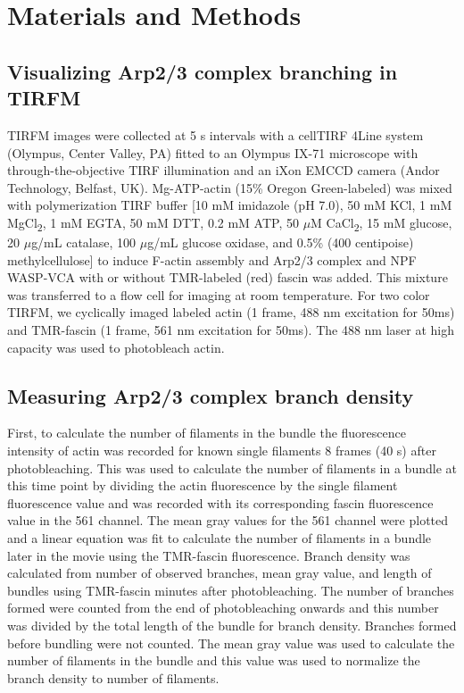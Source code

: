 \section{Materials and Methods}\label{bundlers-matmeth}
\subsection{Visualizing Arp2/3 complex branching in TIRFM}
TIRFM images were collected at 5 s intervals with a cellTIRF 4Line system (Olympus, Center Valley, PA) fitted to an Olympus IX-71 microscope with through-the-objective TIRF illumination and an iXon EMCCD camera (Andor Technology, Belfast, UK). Mg-ATP-actin (15\% Oregon Green-labeled) was mixed with polymerization TIRF buffer [10 mM imidazole (pH 7.0), 50 mM KCl, 1 mM MgCl\textsubscript{2}, 1 mM EGTA, 50 mM DTT, 0.2 mM ATP, 50 $\mu$M CaCl\textsubscript{2}, 15 mM glucose, 20 $\mu$g/mL catalase, 100 $\mu$g/mL glucose oxidase, and 0.5\% (400 centipoise) methylcellulose] to induce F-actin assembly and Arp2/3 complex and NPF WASP-VCA with or without TMR-labeled (red) fascin was added. This mixture was transferred to a flow cell for imaging at room temperature. For two color TIRFM, we cyclically imaged labeled actin (1 frame, 488 nm excitation for 50ms) and TMR-fascin (1 frame, 561 nm excitation for 50ms). The 488 nm laser at high capacity was used to photobleach actin. 

\subsection{Measuring Arp2/3 complex branch density}
First, to calculate the number of filaments in the bundle the fluorescence intensity of actin was recorded for known single filaments 8 frames (40 s) after photobleaching. This was used to calculate the number of filaments in a bundle at this time point by dividing the actin fluorescence by the single filament fluorescence value and was recorded with its corresponding fascin fluorescence value in the 561 channel. The mean gray values for the 561 channel were plotted and a linear equation was fit to calculate the number of filaments in a bundle later in the movie using the TMR-fascin fluorescence. Branch density was calculated from number of observed branches, mean gray value, and length of bundles using TMR-fascin  minutes after photobleaching. The number of branches formed were counted from the end of photobleaching onwards and this number was divided by the total length of the bundle for branch density. Branches formed before bundling were not counted. The mean gray value was used to calculate the number of filaments in the bundle and this value was used to normalize the branch density to number of filaments.

